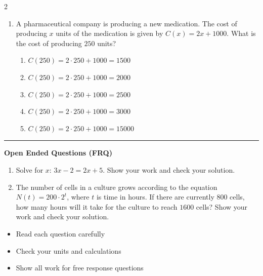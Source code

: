 \documentclass[10pt]{article}
\begin{document}
\begin{multicols}{2}
\begin{enumerate}[label=\textbf{Q\arabic*.}, leftmargin=*, itemsep=6pt, parsep=0pt]
  \item \small A pharmaceutical company is producing a new medication. The cost of producing $x$ units of the medication is given by $C(x) = 2x + 1000$. What is the cost of producing $250$ units?
  \begin{enumerate}[label=(\Alph*), leftmargin=0.6cm, nosep, itemsep=2pt]
    \item $C(250) = 2 \cdot 250 + 1000 = 1500$
    \item $C(250) = 2 \cdot 250 + 1000 = 2000$
    \item $C(250) = 2 \cdot 250 + 1000 = 2500$
    \item $C(250) = 2 \cdot 250 + 1000 = 3000$
    \item $C(250) = 2 \cdot 250 + 1000 = 15000$
  \end{enumerate}

\end{enumerate}
\end{multicols}

\vspace{-0.2cm}
\hrule
\vspace{0.2cm}
\textbf{\small Open Ended Questions (FRQ)}
\begin{enumerate}[label=\textbf{Q\arabic*.}, start=9, itemsep=5pt, topsep=0pt]

  \item \small Solve for $x$: $3x - 2 = 2x + 5$. Show your work and check your solution. \vspace{2cm}

  \item \small The number of cells in a culture grows according to the equation $N(t) = 200 \cdot 2^t$, where $t$ is time in hours. If there are currently $800$ cells, how many hours will it take for the culture to reach $1600$ cells? Show your work and check your solution. \vspace{2cm}

\end{enumerate}

\vfill

\begin{tcolorbox}[colback=blue!5, colframe=mainblue!50, title=\small \textbf{Chef's Tips}, fonttitle=\bfseries, bottom=1mm]
\begin{itemize}[noitemsep, topsep=2pt, leftmargin=0.5cm]
  \item \scriptsize Read each question carefully\item \scriptsize Check your units and calculations\item \scriptsize Show all work for free response questions
\end{itemize}
\end{tcolorbox}
\end{document}
